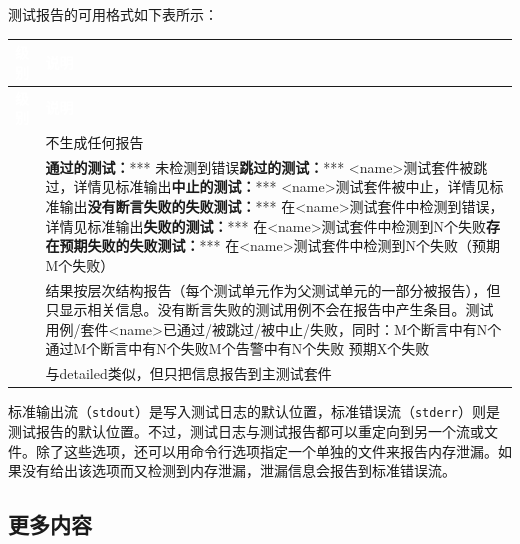 
测试报告的可用格式如下表所示：



\myTableBegin
\begin{xltabular}{\textwidth}{|>{\hsize\raggedright\arraybackslash}X|>{\hsize\raggedright\arraybackslash}X|}
\hline
{} \textcolor{white}{\textbf{级别}} & \textcolor{white}{\textbf{说明}} \\
\hline
\endfirsthead
{} \textcolor{white}{\textbf{级别}} & \textcolor{white}{\textbf{说明}} \\
\hline
\endhead
{} & 不生成任何报告\\
\hline
{} & \textbf{通过的测试：}*** 未检测到错误\textbf{跳过的测试：}*** <name>测试套件被跳过，详情见标准输出\textbf{中止的测试：}*** <name>测试套件被中止，详情见标准输出\textbf{没有断言失败的失败测试：}*** 在<name>测试套件中检测到错误，详情见标准输出\textbf{失败的测试：}*** 在<name>测试套件中检测到N个失败\textbf{存在预期失败的失败测试：}*** 在<name>测试套件中检测到N个失败（预期M个失败）\\
\hline
{} & 结果按层次结构报告（每个测试单元作为父测试单元的一部分被报告），但只显示相关信息。没有断言失败的测试用例不会在报告中产生条目。测试用例/套件<name>已通过/被跳过/被中止/失败，同时：M个断言中有N个通过M个断言中有N个失败M个告警中有N个失败 预期X个失败\\
\hline
{} & 与detailed类似，但只把信息报告到主测试套件\\
\hline
\end{xltabular}
\myTableEnd






标准输出流（\texttt{stdout}）是写入测试日志的默认位置，标准错误流（\texttt{stderr}）则是测试报告的默认位置。不过，测试日志与测试报告都可以重定向到另一个流或文件。除了这些选项，还可以用命令行选项指定一个单独的文件来报告内存泄漏。如果没有给出该选项而又检测到内存泄漏，泄漏信息会报告到标准错误流。



\subsection{更多内容}


